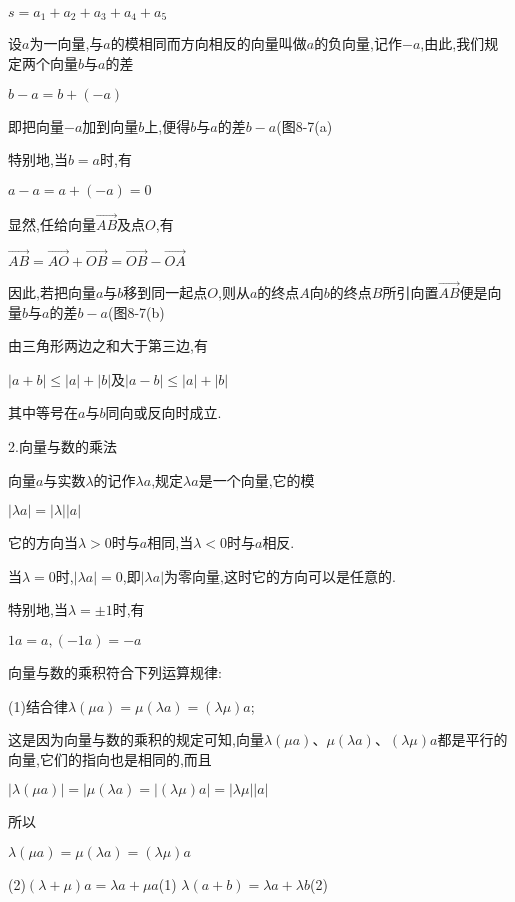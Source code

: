 \documentclass[oneside]{book}
\begin{document}
$s = {a_1} + {a_2} + {a_3} + {a_4} + {a_5}$

设$a$为一向量,与$a$的模相同而方向相反的向量叫做$a$的负向量,记作$ - a$,由此,我们规定两个向量$b$与$a$的差

$b - a = b + ( - a)$

即把向量$ - a$加到向量$b$上,便得$b$与$a$的差$b-a$(图8-7(a)

特别地,当$b=a$时,有

$a-a=a+(-a)=0$

显然,任给向量$\overrightarrow {AB} $及点$O$,有

$\overrightarrow {AB}  = \overrightarrow {AO}  + \overrightarrow {OB}  = \overrightarrow {OB}  - \overrightarrow {OA} $

因此,若把向量$a$与$b$移到同一起点$O$,则从$a$的终点$A$向$b$的终点$B$所引向置$\overrightarrow {AB} $便是向量$b$与$a$的差$b-a$(图8-7(b)

由三角形两边之和大于第三边,有

$|a + b| \leqslant |a| + |b|$及$|a - b| \leqslant |a| + |b|$

其中等号在$a$与$b$同向或反向时成立.

2.向量与数的乘法

向量$a$与实数$\lambda $的记作$\lambda a$,规定$\lambda a$是一个向量,它的模

$|\lambda a| = |\lambda ||a|$

它的方向当$\lambda  > 0$时与$a$相同,当$\lambda  < 0$时与$a$相反.

当$\lambda  = 0$时,$|\lambda a| = 0$,即$|\lambda a|$为零向量,这时它的方向可以是任意的.

特别地,当$\lambda  =  \pm 1$时,有

$1a = a,( - 1a) =  - a$

向量与数的乘积符合下列运算规律:

(1)结合律$\lambda \left( {\mu a} \right) = \mu \left( {\lambda a} \right) = \left( {\lambda \mu } \right)a$;

这是因为向量与数的乘积的规定可知,向量$\lambda \left( {\mu a} \right)$、$\mu \left( {\lambda a} \right)$、$\left( {\lambda \mu } \right)a$都是平行的向量,它们的指向也是相同的,而且

$|\lambda \left( {\mu a} \right)| = |\mu \left( {\lambda a} \right) = |\left( {\lambda \mu } \right)a| = |\lambda \mu ||a|$

所以

$\lambda \left( {\mu a} \right) = \mu \left( {\lambda a} \right) = \left( {\lambda \mu } \right)a$

(2)$\left( {\lambda  + \mu } \right)a = \lambda a + \mu a$(1)
$\lambda \left( {a + b} \right) = \lambda a + \lambda b$(2)
\end{document}
